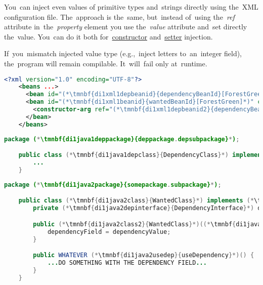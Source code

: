 \emtwen
{}
\label{injectingliteralvalues}
You~can inject even values of primitive types and~strings directly using the~XML configuration file.
The~approach is the~same, but~instead of~using the~\textit{ref} attribute in~the~\textit{property} element you use the~\textit{value} attribute and~set directly the~value.
You~can do it both for~\hyperref[constructorinjection]{constructor} and~\hyperref[setterinjection]{setter} injection.

\warning If~you~mismatch injected value type (e.g.,~inject letters to~an~integer field), the~program will remain compilable.
It~will~fail only at~runtime.
\newpage

\begin{lstlisting}[language=XML, title={Configuration XML}]
    <?xml version="1.0" encoding="UTF-8"?>
    <beans ...>
      <bean id="(*\tmnbf{di1xml1depbeanid}{dependencyBeanId}[ForestGreen]*)" class="(*\tmnbf{di1xml1deppackage}{deppackage.depsubpackage}[ForestGreen]*).(*\tmnbf{di1xml1depclass}{DependencyClass}[ForestGreen]*)"/>
      <bean id="(*\tmnbf{di1xml1beanid}{wantedBeanId}[ForestGreen]*)" class="(*\tmnbf{di1xml1package}{somepackage.subpackage}[ForestGreen]*).(*\tmnbf{di1xml1class}{WantedClass}[ForestGreen]*)">
        <constructor-arg ref="(*\tmnbf{di1xml1depbeanid2}{dependencyBeanId}[ForestGreen]*)"/>
      </bean>
    </beans>
\end{lstlisting}
\begin{lstlisting}[language=Java, title={Dependency class}]
    package (*\tmnbf{di1java1deppackage}{deppackage.depsubpackage}*);

    public class (*\tmnbf{di1java1depclass}{DependencyClass}*) implements (*\tmnbf{di1java1depinterface}{DependencyInterface}*) {
        ...
    }
\end{lstlisting}
\begin{lstlisting}[language=Java, title={Wanted class with the constructor}]
    package (*\tmnbf{di1java2package}{somepackage.subpackage}*);

    public class (*\tmnbf{di1java2class}{WantedClass}*) implements (*\tmnbf{di1java2interface}{WantedClassInterface}*) {
        private (*\tmnbf{di1java2depinterface}{DependencyInterface}*) dependencyField;

        public (*\tmnbf{di1java2class2}{WantedClass}*)((*\tmnbf{di1java2depinterface2}{DependencyInterface}*) dependencyValue) {
            dependencyField = dependencyValue;
        }

        public WHATEVER (*\tmnbf{di1java2usedep}{useDependency}*)() {
            ...DO SOMETHING WITH THE DEPENDENCY FIELD...
        }
    }
\end{lstlisting}
